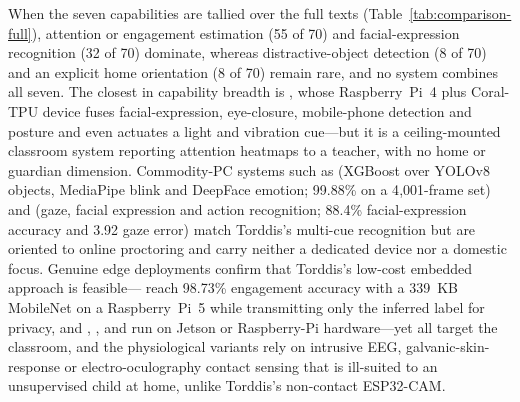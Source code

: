 When the seven capabilities are tallied over the full texts (Table~\ref{tab:comparison-full}), attention or engagement estimation (55 of 70) and facial-expression recognition (32 of 70) dominate, whereas distractive-object detection (8 of 70) and an explicit home orientation (8 of 70) remain rare, and no system combines all seven. The closest in capability breadth is \citet{Cao2026Yolov8Based}, whose Raspberry~Pi~4 plus Coral-TPU device fuses facial-expression, eye-closure, mobile-phone detection and posture and even actuates a light and vibration cue---but it is a ceiling-mounted classroom system reporting attention heatmaps to a teacher, with no home or guardian dimension. Commodity-PC systems such as \citet{Singh2026Utilizing} (XGBoost over YOLOv8 objects, MediaPipe blink and DeepFace emotion; 99.88\% on a 4{,}001-frame set) and \citet{Qi2024Evaluation} (gaze, facial expression and action recognition; 88.4\% facial-expression accuracy and 3.92\textdegree{} gaze error) match Torddis's multi-cue recognition but are oriented to online proctoring and carry neither a dedicated device nor a domestic focus. Genuine edge deployments confirm that Torddis's low-cost embedded approach is feasible---\citet{Abushahla2025RealTime} reach 98.73\% engagement accuracy with a 339~KB MobileNet on a Raspberry~Pi~5 while transmitting only the inferred label for privacy, and \citet{Le2022Desk}, \citet{Guo2026RealTime}, \citet{Elmugamer2024Evaluating} and \citet{Wang2025IotEnabled} run on Jetson or Raspberry-Pi hardware---yet all target the classroom, and the physiological variants \citep{Thaseen2026Iot, Liu2022Enabled, Sudharsan2024Behavior, Kim2018RealTime, Abdo2021Attention} rely on intrusive EEG, galvanic-skin-response or electro-oculography contact sensing that is ill-suited to an unsupervised child at home, unlike Torddis's non-contact ESP32-CAM.

